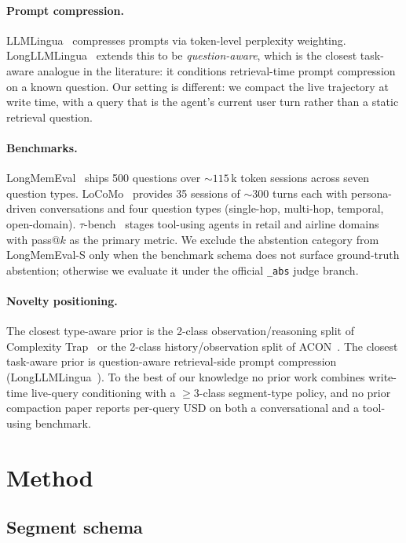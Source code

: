 \documentclass{article}
\begin{document}
\paragraph{Prompt compression.}
LLMLingua~\citep{llmlingua_2023} compresses prompts via token-level
perplexity weighting. LongLLMLingua~\citep{longllmlingua_2023} extends
this to be \emph{question-aware}, which is the closest task-aware analogue
in the literature: it conditions retrieval-time prompt compression on a
known question. Our setting is different: we compact the live trajectory
at write time, with a query that is the agent's current user turn rather
than a static retrieval question.

\paragraph{Benchmarks.}
LongMemEval~\citep{longmemeval_2024} ships 500 questions over $\sim\!115$\,k
token sessions across seven question types. LoCoMo~\citep{locomo_2024}
provides 35 sessions of $\sim\!300$ turns each with persona-driven
conversations and four question types (single-hop, multi-hop, temporal,
open-domain). $\tau$-bench~\citep{taubench_2024} stages tool-using agents
in retail and airline domains with pass@$k$ as the primary metric.
We exclude the abstention category from LongMemEval-S only when the
benchmark schema does not surface ground-truth abstention; otherwise we
evaluate it under the official \texttt{\_abs} judge branch.

\paragraph{Novelty positioning.}
The closest type-aware prior is the 2-class observation/reasoning split of
Complexity Trap~\citep{complexity_trap_2025} or the 2-class
history/observation split of ACON~\citep{acon_2025}. The closest task-aware
prior is question-aware retrieval-side prompt compression
(LongLLMLingua~\citep{longllmlingua_2023}). To the best of our knowledge no
prior work combines write-time live-query conditioning with a $\geq3$-class
segment-type policy, and no prior compaction paper reports per-query USD on
both a conversational and a tool-using benchmark.

\section{Method}\label{sec:method}

\subsection{Segment schema}
\end{document}
